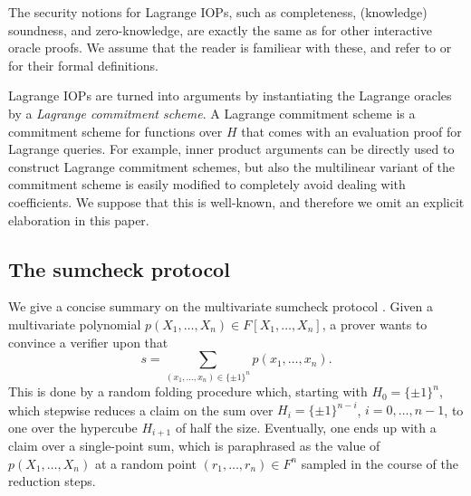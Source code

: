 \documentclass[11pt]{article}
\theoremstyle{definition}
\theoremstyle{remark}
\begin{document}
The security notions for Lagrange IOPs, such as completeness, (knowledge) soundness, and zero-knowledge, are exactly the same as for other interactive oracle proofs.
We assume that the reader is familiear with these, and refer to \cite{IOPs} or \cite{Dark} for their formal definitions.

Lagrange IOPs are turned into arguments by instantiating the Lagrange oracles by a  \textit{Lagrange commitment scheme}.
A Lagrange commitment scheme is a commitment scheme for functions over $H$ that comes with an evaluation proof for Lagrange queries.
For example, inner product arguments \cite{BootleGroth} can be directly used to construct Lagrange commitment schemes,
but also the multilinear variant \cite{MVKZG} of the \cite{Kate} commitment scheme is easily modified to completely avoid dealing with coefficients. 
We suppose that this is well-known, and therefore we omit an explicit elaboration in this paper.


\subsection{The sumcheck protocol}

We give a concise summary on the multivariate sumcheck protocol \cite{sumcheck}.
Given a multivariate polynomial $p(X_1,\ldots, X_n)\in F[X_1,\ldots, X_n]$, a prover wants to convince a verifier upon that
\begin{equation*}
s = \sum_{(x_1,\ldots, x_n) \in \{\pm 1\}^n} p(x_1, \ldots, x_n).
\end{equation*}
This is done by a random folding procedure which, starting with $H_0=\{\pm 1\}^n$, which stepwise reduces a claim on the sum over $H_i = \{\pm 1\}^{n-i}$, $i=0,\ldots, n-1$, to one over the hypercube $H_{i+1}$ of half the size. 
Eventually, one ends up with a claim over a single-point sum, which is paraphrased as the value of $p(X_1,\ldots, X_n)$ at a random point $(r_1,\ldots, r_n)\in F^n$ sampled in the course of the reduction steps.
\end{document}
